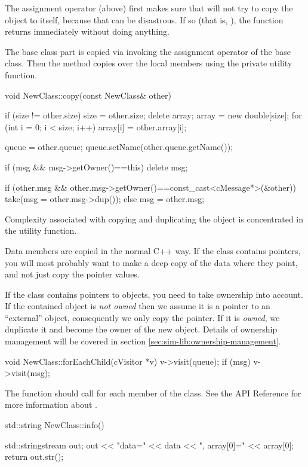The assignment operator (above) first makes sure that will not try to copy
the object to itself, because that can be disastrous. If so (that is,
), the function returns immediately without doing anything.

The base class part is copied via invoking the assignment operator of
the base class. Then the method copies over the local members using the
 private utility function.

\begin{cpp}
void NewClass::copy(const NewClass& other)
{
    if (size != other.size) {
        size = other.size;
        delete array;
        array = new double[size];
    }
    for (int i = 0; i < size; i++)
        array[i] = other.array[i];

    queue = other.queue;
    queue.setName(other.queue.getName());

    if (msg && msg->getOwner()==this)
        delete msg;

    if (other.msg && other.msg->getOwner()==const_cast<cMessage*>(&other))
        take(msg = other.msg->dup());
    else
        msg = other.msg;
}
\end{cpp}

Complexity associated with copying and duplicating the object
is concentrated in the  utility function.

Data members are copied in the normal C++ way. If the class
contains pointers, you will most probably want to make a deep copy of
the data where they point, and not just copy the pointer values.

If the class contains pointers to {\opp} objects, you need
to take ownership into account. If the contained object is \textit{not owned}
then we assume it is a pointer to an ``external'' object, consequently
we only copy the pointer. If it is \textit{owned}, we duplicate
it and become the owner of the new object. Details of ownership
management will be covered in section \ref{sec:sim-lib:ownership-management}.


\begin{cpp}
void NewClass::forEachChild(cVisitor *v)
{
    v->visit(queue);
    if (msg)
        v->visit(msg);
}
\end{cpp}

The  function should call 
for each  member of the class. See the API Reference for more
information about .

\begin{cpp}
std::string NewClass::info()
{
    std::stringstream out;
    out << "data=" << data << ", array[0]=" << array[0];
    return out.str();

}
\end{cpp}

